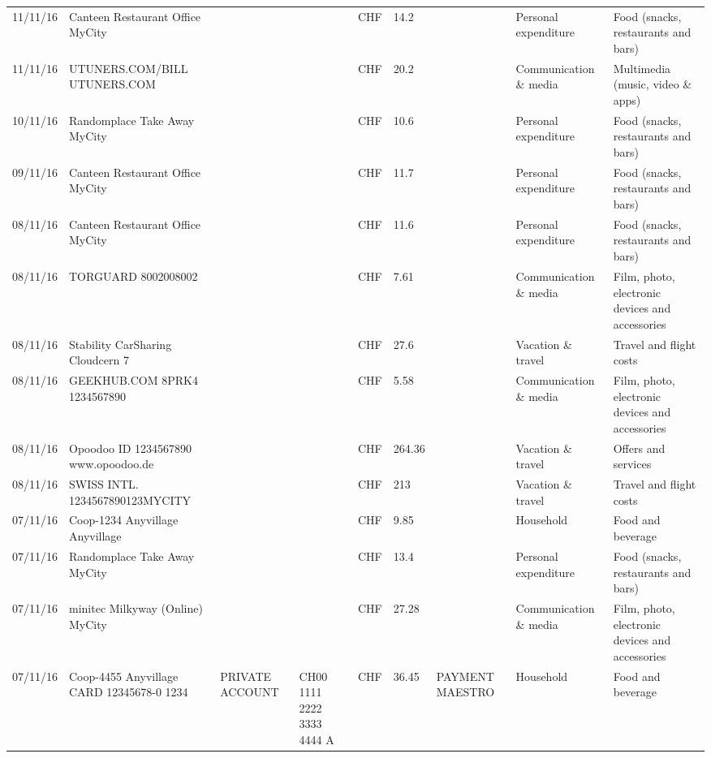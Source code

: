 \begin{landscape}
\begin{center}
\begin{longtable}{lllllllll}
		11/11/16 & Canteen Restaurant Office      MyCity &       &       & CHF   & 14.2  &       & Personal expenditure & Food (snacks, restaurants and bars) \\
		11/11/16 & UTUNERS.COM/BILL          UTUNERS.COM &       &       & CHF   & 20.2  &       & Communication \& media & Multimedia (music, video \& apps) \\
		10/11/16 & Randomplace Take Away     MyCity &       &       & CHF   & 10.6  &       & Personal expenditure & Food (snacks, restaurants and bars) \\
		09/11/16 & Canteen Restaurant Office      MyCity &       &       & CHF   & 11.7  &       & Personal expenditure & Food (snacks, restaurants and bars) \\
		08/11/16 & Canteen Restaurant Office      MyCity &       &       & CHF   & 11.6  &       & Personal expenditure & Food (snacks, restaurants and bars) \\
		08/11/16 & TORGUARD                 8002008002 &       &       & CHF   & 7.61  &       & Communication \& media & Film, photo, electronic devices and accessories \\
		08/11/16 & Stability CarSharing      Cloudcern 7 &       &       & CHF   & 27.6  &       & Vacation \& travel & Travel and flight costs \\
		08/11/16 & GEEKHUB.COM  8PRK4        1234567890 &       &       & CHF   & 5.58  &       & Communication \& media & Film, photo, electronic devices and accessories \\
		08/11/16 & Opoodoo ID 1234567890      www.opoodoo.de &       &       & CHF   & 264.36 &       & Vacation \& travel & Offers and services \\
		08/11/16 & SWISS INTL. 1234567890123MYCITY &       &       & CHF   & 213   &       & Vacation \& travel & Travel and flight costs \\
		07/11/16 & Coop-1234 Anyvillage    Anyvillage &       &       & CHF   & 9.85  &       & Household & Food and beverage \\
		07/11/16 & Randomplace Take Away     MyCity &       &       & CHF   & 13.4  &       & Personal expenditure & Food (snacks, restaurants and bars) \\
		07/11/16 & minitec Milkyway (Online) MyCity &       &       & CHF   & 27.28 &       & Communication \& media & Film, photo, electronic devices and accessories \\
		07/11/16 & Coop-4455 Anyvillage CARD 12345678-0 1234 & PRIVATE ACCOUNT & CH00 1111 2222 3333 4444 A & CHF   & 36.45 & PAYMENT MAESTRO & Household & Food and beverage \\

\end{longtable}
\end{center}
\end{landscape}
